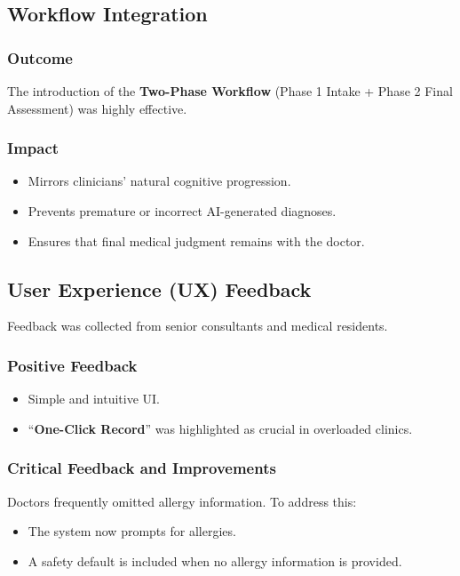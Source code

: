 \subsection{Workflow Integration}
\label{sec:results:workflow}

\subsubsection*{Outcome}
The introduction of the \textbf{Two-Phase Workflow} (Phase 1 Intake + Phase 2 Final Assessment) 
was highly effective.

\subsubsection*{Impact}
\begin{itemize}
    \item Mirrors clinicians’ natural cognitive progression.
    \item Prevents premature or incorrect AI-generated diagnoses.
    \item Ensures that final medical judgment remains with the doctor.
\end{itemize}

\subsection{User Experience (UX) Feedback}
\label{sec:results:ux}

Feedback was collected from senior consultants and medical residents.

\subsubsection*{Positive Feedback}
\begin{itemize}
    \item Simple and intuitive UI.
    \item “\textbf{One-Click Record}” was highlighted as crucial in overloaded clinics.
\end{itemize}

\subsubsection*{Critical Feedback and Improvements}
Doctors frequently omitted allergy information.  
To address this:

\begin{itemize}
    \item The system now prompts for allergies.
    \item A safety default is included when no allergy information is provided.
\end{itemize}

